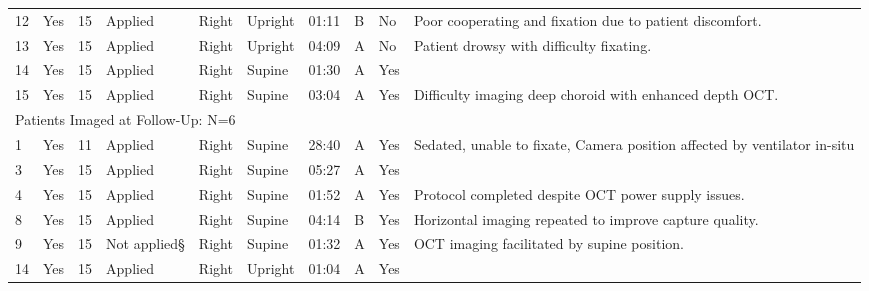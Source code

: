 {\begin{tabular}{lllllllllp{6cm}}
12 & Yes & 15 & Applied & Right & Upright & 01:11 & B & No & Poor cooperating and fixation due to patient discomfort. \\
13 & Yes & 15 & Applied & Right & Upright & 04:09 & A & No & Patient drowsy with difficulty fixating. \\
14 & Yes & 15 & Applied & Right & Supine & 01:30 & A & Yes &  \\
15 & Yes & 15 & Applied & Right & Supine & 03:04 & A & Yes & Difficulty imaging deep choroid with enhanced depth OCT. \\
\midrule
\multicolumn{10}{l}{Patients Imaged at Follow-Up: N=6} \\
\midrule
1 & Yes & 11 & Applied & Right & Supine & 28:40 & A & Yes & Sedated, unable to fixate, Camera position affected by ventilator in-situ \\
3 & Yes & 15 & Applied & Right & Supine & 05:27 & A & Yes &  \\
4 & Yes & 15 & Applied & Right & Supine & 01:52 & A & Yes & Protocol completed despite \acrshort{OCT} power supply issues. \\
8 & Yes & 15 & Applied & Right & Supine & 04:14 & B & Yes & Horizontal imaging repeated to improve capture quality. \\
9 & Yes & 15 & Not applied§ & Right & Supine & 01:32 & A & Yes & \acrshort{OCT} imaging facilitated by supine position. \\
14 & Yes & 15 & Applied & Right & Upright & 01:04 & A & Yes & \\
\bottomrule
\end{tabular}
}



